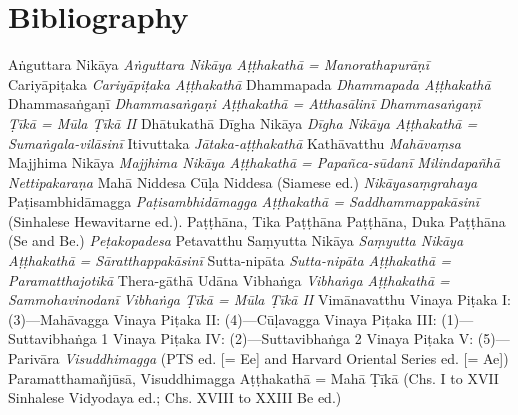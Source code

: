 \ifplastex
	\chapter{Bibliography}
\else
\fi
\begin{thebibliography}{xxxxxxxxxxx}
 Aṅguttara Nikāya
 \emph{Aṅguttara Nikāya Aṭṭhakathā = Manorathapurāṇī}
 Cariyāpiṭaka
 \emph{Cariyāpiṭaka Aṭṭhakathā}
 Dhammapada
 \emph{Dhammapada Aṭṭhakathā}
 Dhammasaṅgaṇī
 \emph{Dhammasaṅgaṇi Aṭṭhakathā = Atthasālinī}
 \emph{Dhammasaṅgaṇī Ṭīkā = Mūla Ṭīkā II}
 Dhātukathā
 Dīgha Nikāya
 \emph{Dīgha Nikāya Aṭṭhakathā = Sumaṅgala-vilāsinī}
 Itivuttaka
 \emph{Jātaka-aṭṭhakathā}
 Kathāvatthu
 \emph{Mahāvaṃsa}
 Majjhima Nikāya
 \emph{Majjhima Nikāya Aṭṭhakathā = Papañca-sūdanī}
 \emph{Milindapañhā}
 \emph{Nettipakaraṇa}
 Mahā Niddesa
 Cūḷa Niddesa (Siamese ed.)
 \emph{Nikāyasaṃgrahaya}
 Paṭisambhidāmagga
 \emph{Paṭisambhidāmagga Aṭṭhakathā = Saddhammappakāsinī} (Sinhalese Hewavitarne ed.).
 Paṭṭhāna, Tika Paṭṭhāna %
 Paṭṭhāna, Duka Paṭṭhāna (Se and Be.)
 \emph{Peṭakopadesa}
 Petavatthu
 Saṃyutta Nikāya
 \emph{Saṃyutta Nikāya Aṭṭhakathā = Sāratthappakāsinī}
 Sutta-nipāta
 \emph{Sutta-nipāta Aṭṭhakathā = Paramatthajotikā}
 Thera-gāthā
 Udāna
 Vibhaṅga
 \emph{Vibhaṅga Aṭṭhakathā = Sammohavinodanī}
 \emph{Vibhaṅga Ṭīkā = Mūla Ṭīkā II}
 Vimānavatthu
 Vinaya Piṭaka I: (3)—Mahāvagga
 Vinaya Piṭaka II: (4)—Cūḷavagga
 Vinaya Piṭaka III: (1)—Suttavibhaṅga 1
 Vinaya Piṭaka IV: (2)—Suttavibhaṅga 2
 Vinaya Piṭaka V: (5)—Parivāra
 \emph{Visuddhimagga} (PTS ed. [= Ee] and Harvard Oriental Series ed. [= Ae])
 Paramatthamañjūsā, Visuddhimagga Aṭṭhakathā = Mahā Ṭīkā (Chs. I to XVII Sinhalese Vidyodaya ed.; Chs. XVIII to XXIII Be ed.)
\end{thebibliography}
